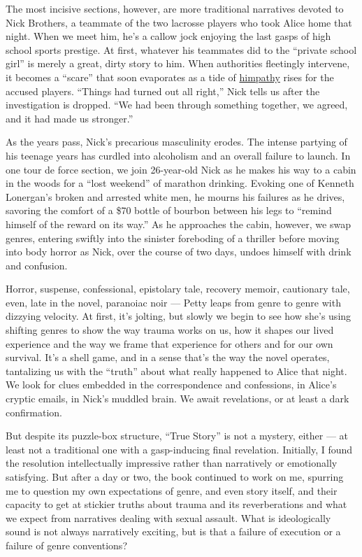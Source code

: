 The most incisive sections, however, are more traditional narratives
devoted to Nick Brothers, a teammate of the two lacrosse players who
took Alice home that night. When we meet him, he's a callow jock
enjoying the last gasps of high school sports prestige. At first,
whatever his teammates did to the ``private school girl'' is merely a
great, dirty story to him. When authorities fleetingly intervene, it
becomes a ``scare'' that soon evaporates as a tide of
\href{https://www.nytimes.com/2018/09/26/opinion/brett-kavanaugh-hearing-himpathy.html}{himpathy}
rises for the accused players. ``Things had turned out all right,'' Nick
tells us after the investigation is dropped. ``We had been through
something together, we agreed, and it had made us stronger.''

As the years pass, Nick's precarious masculinity erodes. The intense
partying of his teenage years has curdled into alcoholism and an overall
failure to launch. In one tour de force section, we join 26-year-old
Nick as he makes his way to a cabin in the woods for a ``lost weekend''
of marathon drinking. Evoking one of Kenneth Lonergan's broken and
arrested white men, he mourns his failures as he drives, savoring the
comfort of a \$70 bottle of bourbon between his legs to ``remind himself
of the reward on its way.'' As he approaches the cabin, however, we swap
genres, entering swiftly into the sinister foreboding of a thriller
before moving into body horror as Nick, over the course of two days,
undoes himself with drink and confusion.

Horror, suspense, confessional, epistolary tale, recovery memoir,
cautionary tale, even, late in the novel, paranoiac noir --- Petty leaps
from genre to genre with dizzying velocity. At first, it's jolting, but
slowly we begin to see how she's using shifting genres to show the way
trauma works on us, how it shapes our lived experience and the way we
frame that experience for others and for our own survival. It's a shell
game, and in a sense that's the way the novel operates, tantalizing us
with the ``truth'' about what really happened to Alice that night. We
look for clues embedded in the correspondence and confessions, in
Alice's cryptic emails, in Nick's muddled brain. We await revelations,
or at least a dark confirmation.

But despite its puzzle-box structure, ``True Story'' is not a mystery,
either --- at least not a traditional one with a gasp-inducing final
revelation. Initially, I found the resolution intellectually impressive
rather than narratively or emotionally satisfying. But after a day or
two, the book continued to work on me, spurring me to question my own
expectations of genre, and even story itself, and their capacity to get
at stickier truths about trauma and its reverberations and what we
expect from narratives dealing with sexual assault. What is
ideologically sound is not always narratively exciting, but is that a
failure of execution or a failure of genre conventions?

